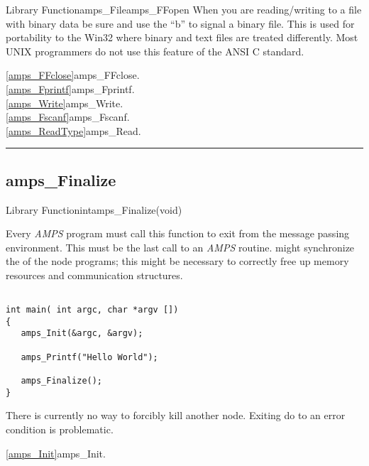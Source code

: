 \begin{deftypefn}{Library Function}{amps_File}{amps\_FFopen}
When you are reading/writing to a file with binary data be sure and
use the ``b'' to signal a binary file.  This is used for portability to
the Win32 where binary and text files are treated differently.  Most
UNIX programmers do not use this feature of the ANSI C standard.

\SEEALSO
\vref{amps_FFclose}{amps\_FFclose}. \\
\vref{amps_Fprintf}{amps\_Fprintf}. \\
\vref{amps_Write}{amps\_Write}. \\
\vref{amps_Fscanf}{amps\_Fscanf}. \\
\vref{amps_ReadType}{amps\_Read}. \\

\end{deftypefn}

\noindent\rule{\textwidth}{1mm}
\subsection{amps\_Finalize}
\label{amps_Finalize}


\begin{deftypefn}{Library Function}{int}{amps\_Finalize}(void)

\DESCRIPTION

Every {\em AMPS} program must call this function to exit from the
message passing environment.  This must be the last call to an
{\em AMPS} routine.   might synchronize the
of the node programs;  this might be necessary to correctly free up
memory resources and communication structures.

\EXAMPLE

\begin{display}\begin{verbatim}

int main( int argc, char *argv [])
{
   amps_Init(&argc, &argv);

   amps_Printf("Hello World");

   amps_Finalize();
}
\end{verbatim}\end{display}

\NOTES

There is currently no way to forcibly kill another node.  Exiting do
to an error condition is problematic.

\SEEALSO
\vref{amps_Init}{amps\_Init}. \\

\end{deftypefn}

